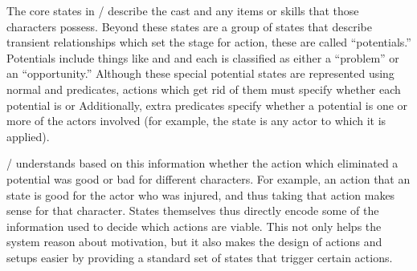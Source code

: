 The core states in \dunyazad/ describe the cast and any items or skills that those characters possess.
%
Beyond these states are a group of states that describe transient relationships which set the stage for action, these are called ``potentials.''
%
Potentials include things like   and  and each is classified as either a ``problem'' or an ``opportunity.''
%
Although these special potential states are represented using normal   and  predicates, actions which get rid of them must specify whether each potential is   or 
%
Additionally, extra predicates specify whether a potential is  one or more of the actors involved (for example, the  state is  any actor to which it is applied).


\dunyazad/ understands based on this information whether the action which eliminated a potential was good or bad for different characters.
%
For example, an action that  an  state is good for the actor who was injured, and thus taking that action makes sense for that character.
%
States themselves thus directly encode some of the information used to decide which actions are viable.
%
This not only helps the system reason about motivation, but it also makes the design of actions and setups easier by providing a standard set of states that trigger certain actions.


